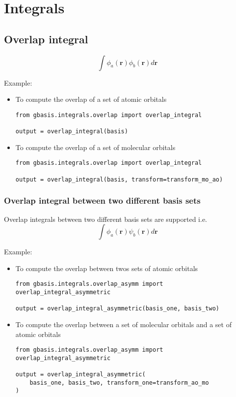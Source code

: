 \documentclass[letterpaper]{article}
\begin{document}
\section{Integrals}

\subsection{Overlap integral}
\begin{equation}
  \label{eq:overlap}
  \int \phi_a (\mathbf{r}) \phi_b (\mathbf{r}) d\mathbf{r}
\end{equation}

Example:
\begin{itemize}
\item To compute the overlap of a set of atomic orbitals
  \begin{lstlisting}[xleftmargin=-25pt]
from gbasis.integrals.overlap import overlap_integral

output = overlap_integral(basis)
\end{lstlisting}
\item To compute the overlap of a set of molecular orbitals
  \begin{lstlisting}[xleftmargin=-25pt]
from gbasis.integrals.overlap import overlap_integral

output = overlap_integral(basis, transform=transform_mo_ao)
\end{lstlisting}
\end{itemize}
\subsubsection{Overlap integral between two different basis sets}
Overlap integrals between two different basis sets are supported i.e.
\begin{equation}
  \label{eq:overlap}
  \int \phi_a (\mathbf{r}) \psi_b (\mathbf{r}) d\mathbf{r}
\end{equation}

Example:
\begin{itemize}
\item To compute the overlap between twos sets of atomic orbitals
  \begin{lstlisting}[xleftmargin=-25pt]
from gbasis.integrals.overlap_asymm import overlap_integral_asymmetric

output = overlap_integral_asymmetric(basis_one, basis_two)
\end{lstlisting}
\item To compute the overlap between a set of molecular orbitals and a set of
  atomic orbitals
\begin{lstlisting}[xleftmargin=-25pt]
from gbasis.integrals.overlap_asymm import overlap_integral_asymmetric

output = overlap_integral_asymmetric(
    basis_one, basis_two, transform_one=transform_ao_mo
)
\end{lstlisting}
\end{itemize}
\end{document}
